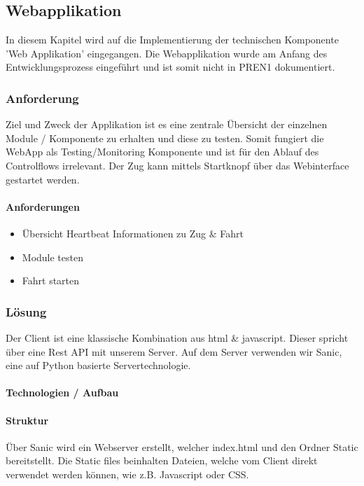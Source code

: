 \documentclass[../../main.tex]{subfiles}
\begin{document}
\subsection{Webapplikation}
In diesem Kapitel wird auf die Implementierung der technischen Komponente 'Web Applikation' eingegangen. Die Webapplikation wurde am Anfang des Entwicklungsprozess eingeführt und ist somit nicht in PREN1 dokumentiert. 
\subsubsection{Anforderung}

Ziel und Zweck der Applikation ist es eine zentrale Übersicht der einzelnen Module / Komponente zu erhalten und diese zu testen. Somit fungiert die WebApp als Testing/Monitoring Komponente und ist für den Ablauf des Controlflows irrelevant. Der Zug kann mittels Startknopf über das Webinterface gestartet werden.

\paragraph{Anforderungen}
\begin{itemize}
    \item Übersicht
      \subitem Heartbeat
      \subitem Informationen zu Zug \& Fahrt
    \item Module testen
    \item Fahrt starten
\end{itemize}

\subsubsection{Lösung}
Der Client ist eine klassische Kombination aus html \& javascript. Dieser spricht über eine Rest API mit unserem Server. Auf dem Server verwenden wir Sanic, eine auf Python basierte Servertechnologie.

\paragraph{Technologien / Aufbau}
 

\paragraph{Struktur}
Über Sanic wird ein Webserver erstellt, welcher index.html und den Ordner Static bereitstellt. Die Static files beinhalten Dateien, welche vom Client direkt verwendet werden können, wie z.B. Javascript oder CSS.
\end{document}
